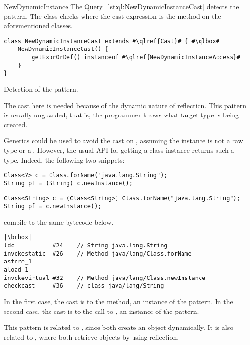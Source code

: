 \begin{pattern}{NewDynamicInstance}
\detection{}
The Query~\ref{lst:ql:NewDynamicInstanceCast} detects the \thisp{} pattern.
The \ql{}  class checks where the cast expression is the  method on the aforementioned classes.

\begin{listing}
\begin{verbatim}
class NewDynamicInstanceCast extends #\qlref{Cast}# { #\qlbox#
	NewDynamicInstanceCast() {
		getExprOrDef() instanceof #\qlref{NewDynamicInstanceAccess}#
	}
}
\end{verbatim}
\caption{Detection of the \thisp{} pattern.}
\label{lst:ql:NewDynamicInstanceCast}
\end{listing}


\issues{}
The cast here is needed because of the dynamic nature of reflection.
This pattern is usually unguarded; that is,
the programmer knows what target type is being created.

Generics could be used to avoid the cast on , assuming the  instance is 
not a raw type or a .
However, the usual API for getting a class instance 
returns such a type.
Indeed, the following two snippets:

\begin{verbatim}
Class<?> c = Class.forName("java.lang.String");
String pf = (String) c.newInstance();
\end{verbatim}

\begin{verbatim}
Class<String> c = (Class<String>) Class.forName("java.lang.String");
String pf = c.newInstance();
\end{verbatim}

compile to the same bytecode below.

\begin{listing}
\begin{verbatim}
|\bcbox|
ldc           #24    // String java.lang.String
invokestatic  #26    // Method java/lang/Class.forName
astore_1
aload_1
invokevirtual #32    // Method java/lang/Class.newInstance
checkcast     #36    // class java/lang/String
\end{verbatim}
\end{listing}

In the first case, the cast is to the  method,
an instance of the \thisp{} pattern.
In the second case, the cast is to the call to ,
an instance of the  pattern.

This pattern is related to ,
since both create an object dynamically.
It is also related to ,
where both retrieve objects by using reflection.

\end{pattern}